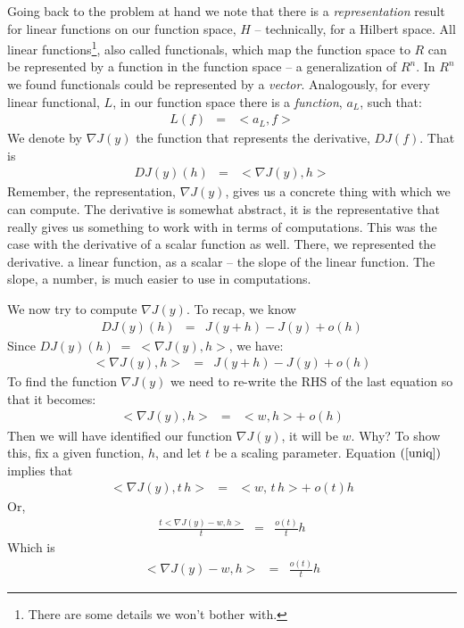 \documentclass{article}
\begin{document}
Going back to the problem at hand we note that there is
a {\em representation\/} result for linear functions on our function space,
$H$ -- technically, for a Hilbert space.
All linear functions\footnote{There are some details we won't bother with.}, also called
functionals, which map the function space to $R$
can be represented by a function in the function space
-- a generalization of $R^n$. In $R^n$ we found functionals could be
represented by a {\em vector\/}. Analogously, for every linear functional, $L$,
in our function space there is a {\em function\/}, $a_L$, such that:
\begin{eqnarray}
L(f) & = & <\!a_L, f\!>
\end{eqnarray}
We denote by $\nabla J(y)$ the
function that represents the derivative, $DJ(f)$. That is
\begin{eqnarray}
  DJ(y)(h) & = & <\!\nabla J(y), h\!>
\end{eqnarray}
Remember, the
representation, $\nabla J(y)$, gives us a concrete thing with which we can compute.
The derivative is somewhat abstract, it is the representative that really
gives us something to work with in terms of computations. This was the case
with the derivative of a scalar function as well. There, we represented the derivative.
a linear function, as a scalar -- the slope of the linear function. The slope, a
number, is much easier to use in computations.

We now try to compute $\nabla J(y)$.
To recap, we know
\begin{eqnarray}
  DJ(y)(h) & = & J(y+h) - J(y) + o(h)
\end{eqnarray}
Since $DJ(y)(h) \; = \; <\!\nabla J(y), h\!>$, we have:
\begin{eqnarray}
  <\!\nabla J(y), h\!> & = & J(y+h) - J(y) + o(h) \label{grad_eq}
\end{eqnarray}
To find the function $\nabla J(y)$ we need to re-write the RHS of the last equation
so that it becomes:
\begin{eqnarray}
  <\!\nabla J(y), h\!> & = & <\!w, h> + \; o(h) \label{uniq}
\end{eqnarray}
Then we will have identified our function $\nabla J(y)$, it will be $w$. Why? 
To show this, fix a given function, $h$, and let $t$ be a scaling parameter.
Equation $(\ref{uniq})$ implies that
\begin{eqnarray}
  <\!\nabla J(y), t\, h\!> & = & <w, \, t\, h> + \; o(t)h 
\end{eqnarray}
Or,
\begin{eqnarray}
	\frac{t <\nabla J(y) - w, h>}{t} & = &  \frac{o(t)}{t}h 
\end{eqnarray}
Which is
\begin{eqnarray}
	<\!\nabla J(y) - w, h> & = & \frac{o(t)}{t}h  \label{uniq-t}
\end{eqnarray}
\end{document}
